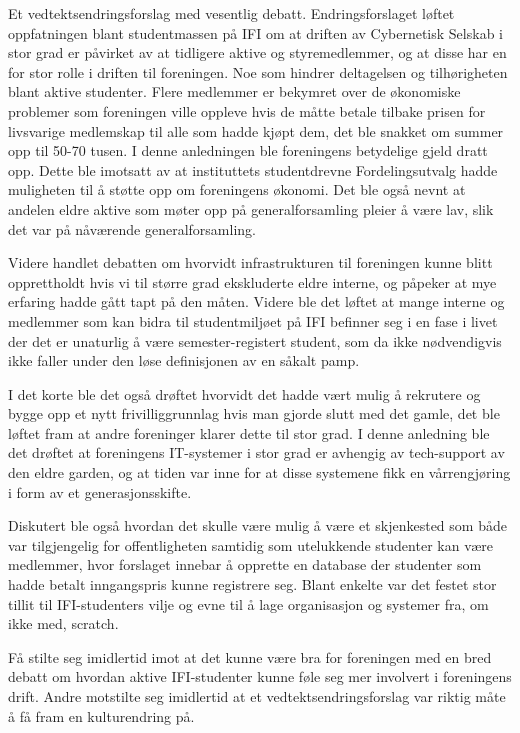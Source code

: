\documentclass[10pt,norsk,a4paper,usenames,dvipsnames]{article}
\begin{document}
        Et vedtektsendringsforslag med vesentlig debatt. Endringsforslaget løftet oppfatningen blant studentmassen på IFI om at driften av Cybernetisk Selskab i stor grad er påvirket av at tidligere aktive og styremedlemmer, og at disse har en for stor rolle i driften til foreningen. Noe som hindrer deltagelsen og tilhørigheten blant aktive studenter. Flere medlemmer er bekymret over de økonomiske problemer som foreningen ville oppleve hvis de måtte betale tilbake prisen for livsvarige medlemskap til alle som hadde kjøpt dem, det ble snakket om summer opp til 50-70 tusen. I denne anledningen ble foreningens betydelige gjeld dratt opp. Dette ble imotsatt av at instituttets studentdrevne Fordelingsutvalg hadde muligheten til å støtte opp om foreningens økonomi. Det ble også nevnt at andelen eldre aktive som møter opp på generalforsamling pleier å være lav, slik det var på nåværende generalforsamling. 
        
        Videre handlet debatten om hvorvidt infrastrukturen til foreningen kunne blitt opprettholdt hvis vi til større grad ekskluderte eldre interne, og påpeker at mye erfaring hadde gått tapt på den måten. Videre ble det løftet at mange interne og medlemmer som kan bidra til studentmiljøet på IFI befinner seg i en fase i livet der det er unaturlig å være semester-registert student, som da ikke nødvendigvis ikke faller under den løse definisjonen av en såkalt pamp.
        
        I det korte ble det også drøftet hvorvidt det hadde vært mulig å rekrutere og bygge opp et nytt frivilliggrunnlag hvis man gjorde slutt med det gamle, det ble løftet fram at andre foreninger klarer dette til stor grad. I denne anledning ble det drøftet at foreningens IT-systemer i stor grad er avhengig av tech-support av den eldre garden, og at tiden var inne for at disse systemene fikk en vårrengjøring i form av et generasjonsskifte. 
        
        Diskutert ble også hvordan det skulle være mulig å være et skjenkested som både var tilgjengelig for offentligheten samtidig som utelukkende studenter kan være medlemmer, hvor forslaget innebar å opprette en database der studenter som hadde betalt inngangspris kunne registrere seg. Blant enkelte var det festet stor tillit til IFI-studenters vilje og evne til å lage organisasjon og systemer fra, om ikke med, scratch.
        
        Få stilte seg imidlertid imot at det kunne være bra for foreningen med en bred debatt om hvordan aktive IFI-studenter kunne føle seg mer involvert i foreningens drift. Andre motstilte seg imidlertid at et vedtektsendringsforslag var riktig måte å få fram en kulturendring på.
        
\end{document}
